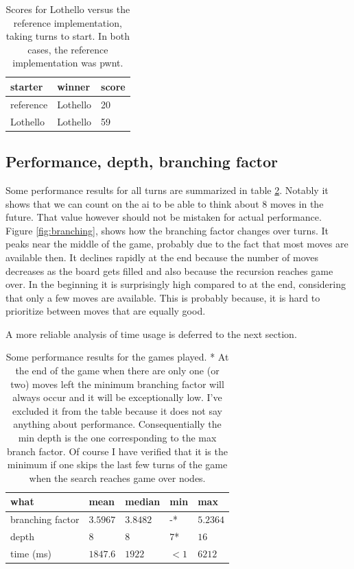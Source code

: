 \documentclass[a4paper,11pt]{article}
\begin{document}
\begin{table}

\centering
\begin{tabular}{|l|l|l|}
\hline
\textbf{starter} & \textbf{winner} & \textbf{score}
\\ \hline
reference & Lothello & 20
\\ \hline
Lothello & Lothello & 59
\\ \hline
\end{tabular}

\caption{Scores for Lothello versus the reference implementation, taking turns to start. In both cases, the reference implementation was pwnt.} \label{tab:score}

\end{table}

\subsection{Performance, depth, branching factor}
Some performance results for all turns are summarized in table \ref{tab:perf}. Notably it shows that we can count on the ai to be able to think about 8 moves in the future. That value however should not be mistaken for actual performance. Figure \ref{fig:branching}, shows how the branching factor changes over turns. It peaks near the middle of the game, probably due to the fact that most moves are available then. It declines rapidly at the end because the number of moves decreases as the board gets filled and also because the recursion reaches game over. In the beginning it is surprisingly high compared to at the end, considering that only a few moves are available. This is probably because, it is hard to prioritize between moves that are equally good.

A more reliable analysis of time usage is deferred to the next section.

\begin{table}

\centering
\begin{tabular}{|l|l|l|l|l|}
\hline
\textbf{what} & \textbf{mean} & \textbf{median} & \textbf{min} & \textbf{max}
\\ \hline
branching factor & $3.5967$ & $3.8482$ & -* & $5.2364$
\\ \hline
depth & $8$ & $8$ & $7$* & $16$
\\ \hline
time (ms) & $1847.6$ & $1922$ & $<1$ & $6212$
\\ \hline
\end{tabular}

\caption{Some performance results for the games played.
\newline
* At the end of the game when there are only one (or two) moves left the minimum branching factor will always occur and it will be exceptionally low. I've excluded it from the table because it does not say anything about performance. Consequentially the min depth is the one corresponding to the max branch factor. Of course I have verified that it is the minimum if one skips the last few turns of the game when the search reaches game over nodes.} \label{tab:perf}

\end{table}
\end{document}
